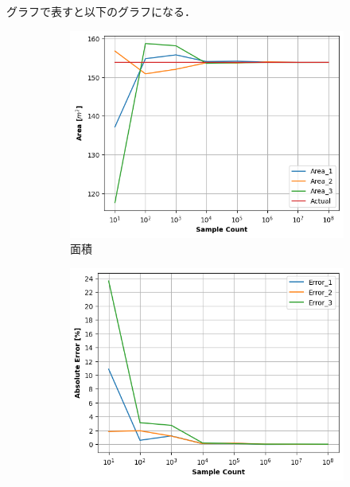 \documentclass[a4j, titlepage]{jarticle}
\begin{document}
        グラフで表すと以下のグラフになる．
        \begin{figure}[htb]
          \begin{subfigure}[b]{0.38\textwidth}
              \centering
              \includegraphics[height=\textwidth]{../Dir_Area/img_area7.png}
              \caption{面積}
              \label{fig:area7}
          \end{subfigure}
          \hspace{50pt}
          \begin{subfigure}[b]{0.38\textwidth}
            \includegraphics[height=\textwidth]{../Dir_Area/img_error7.png}

\end{subfigure}
\end{figure}
\end{document}
